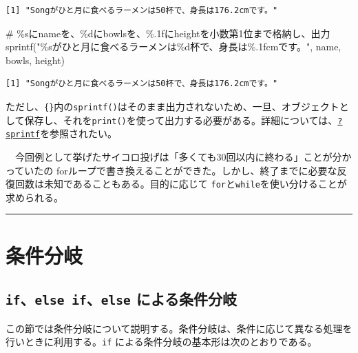 \documentclass[
  a4paper,
  pandoc,
  ja=standard,
  jafont=haranoaji]{bxjsbook}
\newenvironment{Shaded}{\begin{snugshade}}{\end{snugshade}}
\newcommand{\CommentTok}[1]{\textcolor[rgb]{0.37,0.37,0.37}{#1}}
\newcommand{\FunctionTok}[1]{\textcolor[rgb]{0.28,0.35,0.67}{#1}}
\newcommand{\NormalTok}[1]{\textcolor[rgb]{0.00,0.48,0.65}{#1}}
\newcommand{\StringTok}[1]{\textcolor[rgb]{0.13,0.47,0.30}{#1}}
\begin{document}
\begin{verbatim}
[1] "Songがひと月に食べるラーメンは50杯で、身長は176.2cmです。"
\end{verbatim}

\begin{Shaded}
\begin{Highlighting}[numbers=left,,]
\CommentTok{\# \%sにnameを、\%dにbowlsを、\%.1fにheightを小数第1位まで格納し、出力}
\FunctionTok{sprintf}\NormalTok{(}\StringTok{"\%sがひと月に食べるラーメンは\%d杯で、身長は\%.1fcmです。"}\NormalTok{, name, bowls, height)}
\end{Highlighting}
\end{Shaded}

\begin{verbatim}
[1] "Songがひと月に食べるラーメンは50杯で、身長は176.2cmです。"
\end{verbatim}

ただし、\texttt{\{\}}内の\texttt{sprintf()}はそのまま出力されないため、一旦、オブジェクトとして保存し、それを\texttt{print()}を使って出力する必要がある。詳細については、\href{https://www.rdocumentation.org/packages/base/versions/3.6.2/topics/sprintf}{\texttt{?sprintf}}を参照されたい。

　今回例として挙げたサイコロ投げは「多くても30回以内に終わる」ことが分かっていたの
forループで書き換えることができた。しかし、終了までに必要な反復回数は未知であることもある。目的に応じて
\texttt{for}と\texttt{while}を使い分けることが求められる。

\begin{center}\rule{0.5\linewidth}{0.5pt}\end{center}

\hypertarget{sec-programming_condition}{%
\section{条件分岐}\label{sec-programming_condition}}

\hypertarget{ifelse-ifelse-ux306bux3088ux308bux6761ux4ef6ux5206ux5c90}{%
\subsection{\texorpdfstring{\texttt{if}、\texttt{else\ if}、\texttt{else}
による条件分岐}{if、else if、else による条件分岐}}\label{ifelse-ifelse-ux306bux3088ux308bux6761ux4ef6ux5206ux5c90}}

この節では条件分岐について説明する。条件分岐は、条件に応じて異なる処理を行いときに利用する。\texttt{if}
による条件分岐の基本形は次のとおりである。
\end{document}
